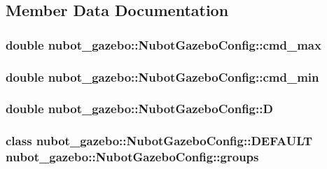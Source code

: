 \subsection{Member Data Documentation}
\hypertarget{classnubot__gazebo_1_1NubotGazeboConfig_ae404cdb1d76241bad987ba2adbe1efaf}{
\subsubsection[{cmd\-\_\-max}]{\setlength{\rightskip}{0pt plus 5cm}double nubot\-\_\-gazebo\-::\-Nubot\-Gazebo\-Config\-::cmd\-\_\-max}}\label{classnubot__gazebo_1_1NubotGazeboConfig_ae404cdb1d76241bad987ba2adbe1efaf}
\hypertarget{classnubot__gazebo_1_1NubotGazeboConfig_a504301edbc6ea775d8d4512a9e88dc78}{
\subsubsection[{cmd\-\_\-min}]{\setlength{\rightskip}{0pt plus 5cm}double nubot\-\_\-gazebo\-::\-Nubot\-Gazebo\-Config\-::cmd\-\_\-min}}\label{classnubot__gazebo_1_1NubotGazeboConfig_a504301edbc6ea775d8d4512a9e88dc78}
\hypertarget{classnubot__gazebo_1_1NubotGazeboConfig_a36f58a1ec4be38b11b4b99199d0307ec}{
\subsubsection[{D}]{\setlength{\rightskip}{0pt plus 5cm}double nubot\-\_\-gazebo\-::\-Nubot\-Gazebo\-Config\-::\-D}}\label{classnubot__gazebo_1_1NubotGazeboConfig_a36f58a1ec4be38b11b4b99199d0307ec}
\hypertarget{classnubot__gazebo_1_1NubotGazeboConfig_ad1f0e71f297397fbc7994b61f9785da5}{
\subsubsection[{groups}]{\setlength{\rightskip}{0pt plus 5cm}class {\bf nubot\-\_\-gazebo\-::\-Nubot\-Gazebo\-Config\-::\-D\-E\-F\-A\-U\-L\-T} nubot\-\_\-gazebo\-::\-Nubot\-Gazebo\-Config\-::groups}}\label{classnubot__gazebo_1_1NubotGazeboConfig_ad1f0e71f297397fbc7994b61f9785da5}
